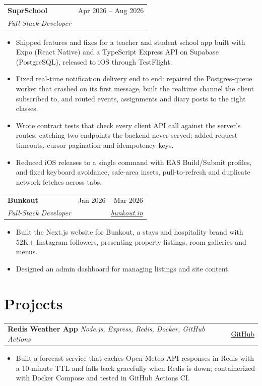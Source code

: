 \documentclass[a4paper,10pt]{article}
\makeatletter
\newcommand{\entry}[4]{%
  \begin{tabularx}{\linewidth}{@{}X r@{}}
    \textbf{#1} & #2 \\
    \textit{#3} & \textit{#4} \\
  \end{tabularx}\vspace{-3pt}}
\newcommand{\project}[3]{%
  \begin{tabularx}{\linewidth}{@{}X r@{}}
    \textbf{#1} \textbar{} \textit{#2} & #3 \\
  \end{tabularx}\vspace{-3pt}}
\makeatother
\begin{document}
\entry{SuprSchool}{Apr 2026 -- Aug 2026}
      {Full-Stack Developer}{}
\begin{itemize}
  \item Shipped features and fixes for a teacher and student school app built with Expo (React Native) and a TypeScript Express API on Supabase (PostgreSQL), released to iOS through TestFlight.
  \item Fixed real-time notification delivery end to end: repaired the Postgres-queue worker that crashed on its first message, built the realtime channel the client subscribed to, and routed events, assignments and diary posts to the right classes.
  \item Wrote contract tests that check every client API call against the server's routes, catching two endpoints the backend never served; added request timeouts, cursor pagination and idempotency keys.
  \item Reduced iOS releases to a single command with EAS Build/Submit profiles, and fixed keyboard avoidance, safe-area insets, pull-to-refresh and duplicate network fetches across tabs.
\end{itemize}

\entry{Bunkout}{Jan 2026 -- Mar 2026}
      {Full-Stack Developer}{\href{https://bunkout.in}{bunkout.in}}
\begin{itemize}
  \item Built the Next.js website for Bunkout, a stays and hospitality brand with 52K+ Instagram followers, presenting property listings, room galleries and menus.
  \item Designed an admin dashboard for managing listings and site content.
\end{itemize}

\section{Projects}

\project{Redis Weather App}{Node.js, Express, Redis, Docker, GitHub Actions}
        {\href{https://github.com/4bhimxnyu/Redis-based-weather-app.}{GitHub}}
\begin{itemize}
  \item Built a forecast service that caches Open-Meteo API responses in Redis with a 10-minute TTL and falls back gracefully when Redis is down; containerized with Docker Compose and tested in GitHub Actions CI.
\end{itemize}
\end{document}
